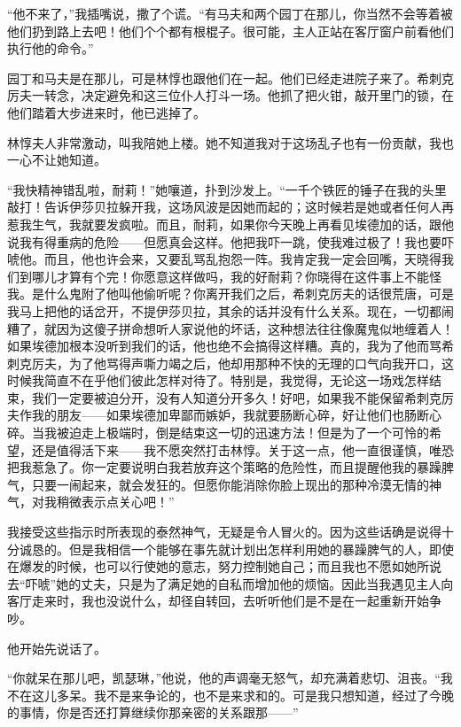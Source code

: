 \par “他不来了，”我插嘴说，撒了个谎。“有马夫和两个园丁在那儿，你当然不会等着被他们扔到路上去吧！他们个个都有根棍子。很可能，主人正站在客厅窗户前看他们执行他的命令。”
\par 园丁和马夫是在那儿，可是林惇也跟他们在一起。他们已经走进院子来了。希刺克厉夫一转念，决定避免和这三位仆人打斗一场。他抓了把火钳，敲开里门的锁，在他们踏着大步进来时，他已逃掉了。
\par 林惇夫人非常激动，叫我陪她上楼。她不知道我对于这场乱子也有一份贡献，我也一心不让她知道。
\par “我快精神错乱啦，耐莉！”她嚷道，扑到沙发上。“一千个铁匠的锤子在我的头里敲打！告诉伊莎贝拉躲开我，这场风波是因她而起的；这时候若是她或者任何人再惹我生气，我就要发疯啦。而且，耐莉，如果你今天晚上再看见埃德加的话，跟他说我有得重病的危险——但愿真会这样。他把我吓一跳，使我难过极了！我也要吓唬他。而且，他也许会来，又要乱骂乱抱怨一阵。我肯定我一定会回嘴，天晓得我们到哪儿才算有个完！你愿意这样做吗，我的好耐莉？你晓得在这件事上不能怪我。是什么鬼附了他叫他偷听呢？你离开我们之后，希刺克厉夫的话很荒唐，可是我马上把他的话岔开，不提伊莎贝拉，其余的话并没有什么关系。现在，一切都闹糟了，就因为这傻子拼命想听人家说他的坏话，这种想法往往像魔鬼似地缠着人！如果埃德加根本没听到我们的话，他也绝不会搞得这样糟。真的，我为了他而骂希刺克厉夫，为了他骂得声嘶力竭之后，他却用那种不快的无理的口气向我开口，这时候我简直不在乎他们彼此怎样对待了。特别是，我觉得，无论这一场戏怎样结束，我们一定要被迫分开，没有人知道分开多久！好吧，如果我不能保留希刺克厉夫作我的朋友——如果埃德加卑鄙而嫉妒，我就要肠断心碎，好让他们也肠断心碎。当我被迫走上极端时，倒是结束这一切的迅速方法！但是为了一个可怜的希望，还是值得活下来——我不愿突然打击林惇。关于这一点，他一直很谨慎，唯恐把我惹急了。你一定要说明白我若放弃这个策略的危险性，而且提醒他我的暴躁脾气，只要一闹起来，就会发狂的。但愿你能消除你脸上现出的那种冷漠无情的神气，对我稍微表示点关心吧！”
\par 我接受这些指示时所表现的泰然神气，无疑是令人冒火的。因为这些话确是说得十分诚恳的。但是我相信一个能够在事先就计划出怎样利用她的暴躁脾气的人，即使在爆发的时候，也可以行使她的意志，努力控制她自己；而且我也不愿如她所说去“吓唬”她的丈夫，只是为了满足她的自私而增加他的烦恼。因此当我遇见主人向客厅走来时，我也没说什么，却径自转回，去听听他们是不是在一起重新开始争吵。
\par 他开始先说话了。
\par “你就呆在那儿吧，凯瑟琳，”他说，他的声调毫无怒气，却充满着悲切、沮丧。“我不在这儿多呆。我不是来争论的，也不是来求和的。可是我只想知道，经过了今晚的事情，你是否还打算继续你那亲密的关系跟那——”
